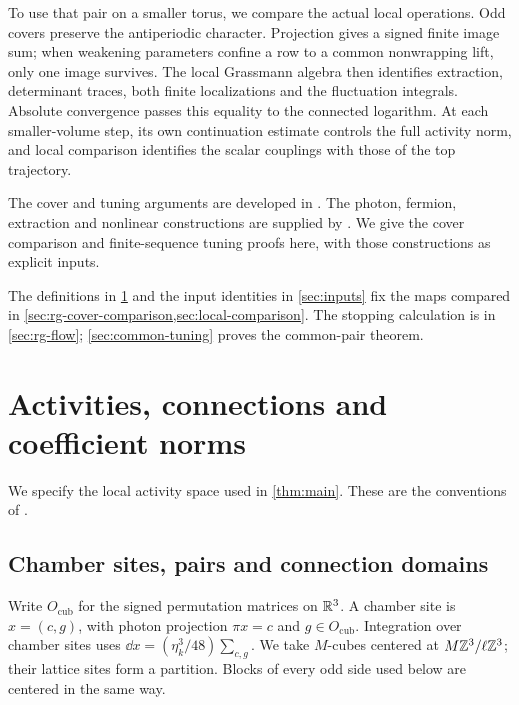 To use that pair on a smaller torus, we compare the actual local
operations. Odd covers preserve the antiperiodic character. Projection
gives a signed finite image sum; when weakening parameters confine a
row to a common nonwrapping lift, only one image survives. The local
Grassmann algebra then identifies extraction, determinant traces, both
finite localizations and the fluctuation integrals. Absolute convergence
passes this equality to the connected logarithm. At each smaller-volume
step, its own continuation estimate controls the full activity norm,
and local comparison identifies the scalar couplings with those of the
top trajectory.

The cover and tuning arguments are developed in
\cite[\S\S15--16]{QED3Master}.
The photon, fermion, extraction and nonlinear constructions are supplied
by \cite{MaxwellBlockManuscript,FermionBlockManuscript,NormalizedContraction,NonlinearStep}.
We give the cover comparison and finite-sequence tuning proofs here,
with those constructions as explicit inputs.

The definitions in \cref{sec:activities} and the input identities in
\cref{sec:inputs} fix the maps compared in
\cref{sec:rg-cover-comparison,sec:local-comparison}.
The stopping calculation is in \cref{sec:rg-flow};
\cref{sec:common-tuning} proves the common-pair theorem.
\section{Activities, connections and coefficient norms}
\label{sec:activities}

We specify the local activity space used in \cref{thm:main}.
These are the conventions of \cite[\S2]{NormalizedContraction}.

\subsection{Chamber sites, pairs and connection domains}

Write \(O_{\mathrm{cub}}\) for the signed permutation matrices on
\(\mathbb R^3\). A chamber site is \(x=(c,g)\), with photon projection
\(\pi x=c\) and \(g\in O_{\mathrm{cub}}\). Integration over chamber
sites uses \(\dd x=(\eta_k^3/48)\sum_{c,g}\). We take
\(M\)-cubes centered at \(M\mathbb Z^3/\ell\mathbb Z^3\); their lattice sites
form a partition. Blocks of every odd side used below are centered
in the same way.


